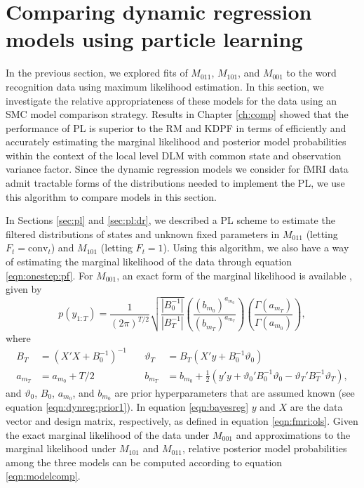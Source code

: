 \section{Comparing dynamic regression models using particle learning \label{sec:fmri:pl}}

In the previous section, we explored fits of $M_{011}$, $M_{101}$, and $M_{001}$ to the word recognition data using maximum likelihood estimation. In this section, we investigate the relative appropriateness of these models for the data using an SMC model comparison strategy. Results in Chapter \ref{ch:comp} showed that the performance of PL is superior to the RM and KDPF in terms of efficiently and accurately estimating the marginal likelihood and posterior model probabilities within the context of the local level DLM with common state and observation variance factor. Since the dynamic regression models we consider for fMRI data admit tractable forms of the distributions needed to implement the PL, we use this algorithm to compare models in this section.

In Sections \ref{sec:pl} and \ref{sec:pl:dr}, we described a PL scheme to estimate the filtered distributions of states and unknown fixed parameters in $M_{011}$ (letting $F_t = \mbox{conv}_t$) and $M_{101}$ (letting $F_t = 1$). Using this algorithm, we also have a way of estimating the marginal likelihood of the data through equation \eqref{eqn:onestep:pf}. For $M_{001}$, an exact form of the marginal likelihood is available \citep{ohagan:bayes:1994}, given by
\begin{equation}
p(y_{1:T}) = \frac{1}{(2\pi)^{T/2}}\sqrt{\frac{|B_0^{-1}|}{|B_T^{-1}|}}\left(\frac{(b_{m_0})^{a_{m_0}}}{(b_{m_T})^{a_{m_T}}}\right)\left(\frac{\Gamma(a_{m_T})}{\Gamma(a_{m_0})}\right), \label{eqn:ols:marglik}
\end{equation}
where
\begin{align}
B_T &= (X'X + B_0^{-1})^{-1} &\quad \vartheta_T &= B_T(X'y + B_0^{-1}\vartheta_0) \label{eqn:bayesreg} \\
a_{m_T} &= a_{m_0} + T/2 &\quad b_{m_T} &= b_{m_0} + \frac{1}{2}(y'y + \vartheta_0'B_0^{-1}\vartheta_0 - \vartheta_T'B_T^{-1}\vartheta_T), \nonumber
\end{align}
and $\vartheta_0$, $B_0$, $a_{m_0}$, and $b_{m_0}$ are prior hyperparameters that are assumed known (see equation \ref{eqn:dynreg:prior1}). In equation \eqref{eqn:bayesreg} $y$ and $X$ are the data vector and design matrix, respectively, as defined in equation \eqref{eqn:fmri:ols}. Given the exact marginal likelihood of the data under $M_{001}$ and approximations to the marginal likelihood under $M_{101}$ and $M_{011}$, relative posterior model probabilities among the three models can be computed according to equation \eqref{eqn:modelcomp}.

